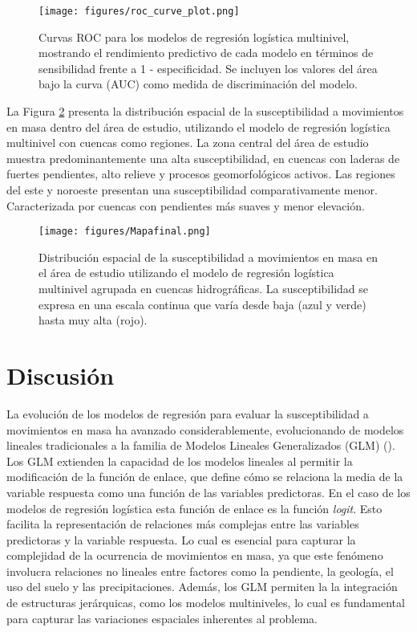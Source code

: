 \documentclass[
  manuscript=article,  
  layout=preprint,  
]{format}
\begin{document}
\begin{figure}[ht!]
    \label{fig:roc}
    \centering
      {\texttt{[image: figures/roc\_curve\_plot.png]}}
\caption{Curvas ROC para los modelos de regresión logística multinivel, mostrando el rendimiento predictivo de cada modelo en términos de sensibilidad frente a 1 - especificidad. Se incluyen los valores del área bajo la curva (AUC) como medida de discriminación del modelo.}
\end{figure}

La Figura \ref{fig:map} presenta la distribución espacial de la susceptibilidad a movimientos en masa dentro del área de estudio, utilizando el modelo de regresión logística multinivel con cuencas como regiones. La zona central del área de estudio muestra predominantemente una alta susceptibilidad, en cuencas con laderas de fuertes pendientes, alto relieve y procesos geomorfológicos activos. Las regiones del este y noroeste presentan una susceptibilidad comparativamente menor. Caracterizada por cuencas con pendientes más suaves y menor elevación.

\begin{figure}[ht!]
    \label{fig:map}
    \centering
      {\texttt{[image: figures/Mapafinal.png]}}
\caption{Distribución espacial de la susceptibilidad a movimientos en masa en el área de estudio utilizando el modelo de regresión logística multinivel agrupada en cuencas hidrográficas. La susceptibilidad se expresa en una escala continua que varía desde baja (azul y verde) hasta muy alta (rojo).}
\end{figure}

\section{Discusión}

La evolución de los modelos de regresión para evaluar la susceptibilidad a movimientos en masa ha avanzado considerablemente, evolucionando de modelos lineales tradicionales a la familia de Modelos Lineales Generalizados (GLM) (\cite{fox2015applied}). Los GLM extienden la capacidad de los modelos lineales al permitir la modificación de la función de enlace, que define cómo se relaciona la media de la variable respuesta como una función de las variables predictoras. En el caso de los modelos de regresión logística esta función de enlace es la función \textit{logit}. Esto facilita la representación de relaciones más complejas entre las variables predictoras y la variable respuesta. Lo cual es esencial para capturar la complejidad de la ocurrencia de movimientos en masa, ya que este fenómeno involucra relaciones no lineales entre factores como la pendiente, la geología, el uso del suelo y las precipitaciones. Además, los GLM permiten la la integración de estructuras jerárquicas, como los modelos multiniveles, lo cual es fundamental para capturar las variaciones espaciales inherentes al problema. 
\end{document}
